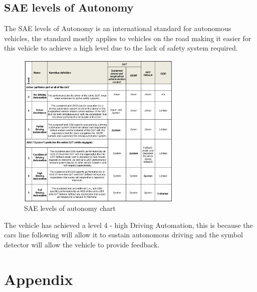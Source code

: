 	\section{SAE levels of Autonomy}

The SAE levels of Autonomy is an international standard for autonomous vehicles, the standard mostly applies to vehicles on the road making it easier for this vehicle to achieve a high level due to the lack of safety system required. 
	
\begin{figure}[h]%
	\centering
	\includegraphics[width = 0.7\textwidth]{"assets/SAE_autonomy_levels"}
	\caption{SAE levels of autonomy chart}
	\label{fig:SAE_levels_chart}
\end{figure}

The vehicle has achieved a level 4 - high Driving Automation, this is because the cars line following will allow it to sustain autonomous driving and the symbol detector will allow the vehicle to provide feedback. 

	
		\chapter*{Appendix}

		\addtocounter{chapter}{1}
		\setcounter{section}{0}
		
